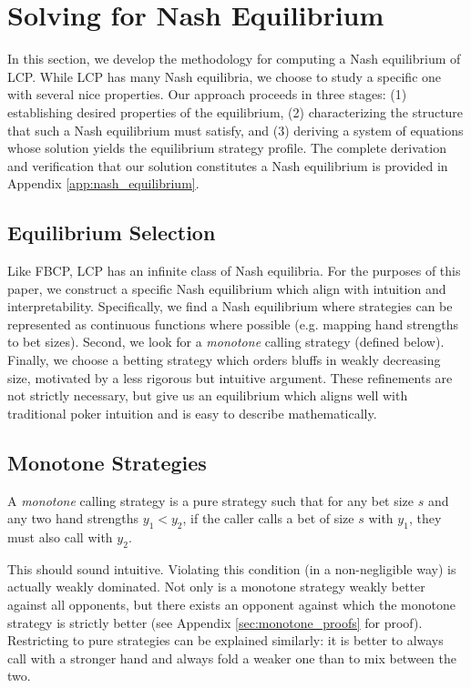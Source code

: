 \documentclass[../../main/main.tex]{subfiles}
\begin{document}
\section{Solving for Nash Equilibrium}
\label{sec:solving_lcp}

In this section, we develop the methodology for computing a Nash equilibrium of LCP. While LCP has many Nash equilibria, we choose to study a specific one with several nice properties. Our approach proceeds in three stages: (1) establishing desired properties of the equilibrium, (2) characterizing the structure that such a Nash equilibrium must satisfy, and (3) deriving a system of equations whose solution yields the equilibrium strategy profile. The complete derivation and verification that our solution constitutes a Nash equilibrium is provided in Appendix \ref{app:nash_equilibrium}.

\subsection{Equilibrium Selection}

Like FBCP, LCP has an infinite class of Nash equilibria. For the purposes of this paper, we construct a specific Nash equilibrium which align with intuition and interpretability. Specifically, we find a Nash equilibrium where strategies can be represented as continuous functions where possible (e.g. mapping hand strengths to bet sizes). Second, we look for a \textit{monotone} calling strategy (defined below). Finally, we choose a betting strategy which orders bluffs in weakly decreasing size, motivated by a less rigorous but intuitive argument. These refinements are not strictly necessary, but give us an equilibrium which aligns well with traditional poker intuition and is easy to describe mathematically.

\subsection{Monotone Strategies}
\label{subsec:monotone_strategies}

\begin{definition}
    A \textit{monotone} calling strategy is a pure strategy such that for any bet size $s$ and any two hand strengths $y_1 < y_2$, if the caller calls a bet of size $s$ with $y_1$, they must also call with $y_2$.
\end{definition}

This should sound intuitive. Violating this condition (in a non-negligible way) is actually weakly dominated. Not only is a monotone strategy weakly better against all opponents, but there exists an opponent against which the monotone strategy is strictly better (see Appendix \ref{sec:monotone_proofs} for proof). Restricting to pure strategies can be explained similarly: it is better to always call with a stronger hand and always fold a weaker one than to mix between the two.
\end{document}
